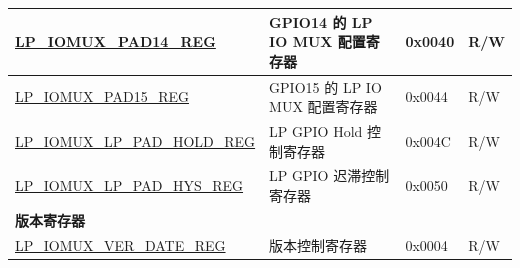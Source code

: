 \begin{longtable}{ | p{6cm} | p{7.2cm} | p{1.3cm} | p{1cm} | }
\hyperref[regdesc:LPIOMUXPADNREG]{LP\_IOMUX\_PAD14\_REG} & GPIO14 的 LP IO MUX 配置寄存器 & 0x0040 & R/W \\ \hline
\hyperref[regdesc:LPIOMUXPADNREG]{LP\_IOMUX\_PAD15\_REG} & GPIO15 的 LP IO MUX 配置寄存器 & 0x0044 & R/W \\ \hline
\hyperref[regdesc:LPIOMUXLPPADHOLDREG]{LP\_IOMUX\_LP\_PAD\_HOLD\_REG} & LP GPIO Hold 控制寄存器 & 0x004C & R/W \\ \hline
\hyperref[regdesc:LPIOMUXLPPADHYSREG]{LP\_IOMUX\_LP\_PAD\_HYS\_REG} & LP GPIO 迟滞控制寄存器 & 0x0050 & R/W \\ \hline
\multicolumn{4}{|l|}{\textbf{版本寄存器}} \\ \hline
\hyperref[regdesc:LPIOMUXVERDATEREG]{LP\_IOMUX\_VER\_DATE\_REG} & 版本控制寄存器 & 0x0004 & R/W \\ \hline
\end{longtable}
